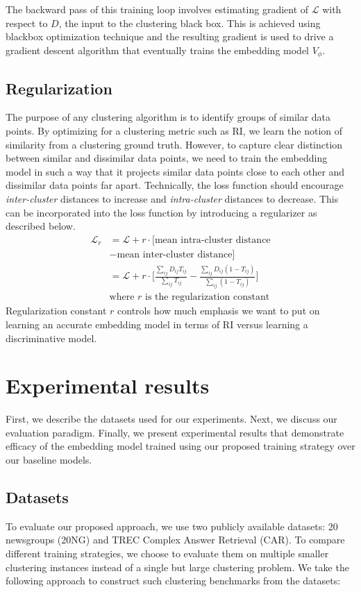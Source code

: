 \documentclass[11pt,a4paper]{article}
\begin{document}
The backward pass of this training loop involves estimating gradient of $\mathcal{L}$ with respect to $D$, the input to the clustering black box. This is achieved using blackbox optimization technique and the resulting gradient is used to drive a gradient descent algorithm that eventually trains the embedding model $V_\phi$. 

\subsection{Regularization}\label{sec:reg} The purpose of any clustering algorithm is to identify groups of similar data points. By optimizing for a clustering metric such as RI, we learn the notion of similarity from a clustering ground truth. However, to capture clear distinction between similar and dissimilar data points, we need to train the embedding model in such a way that it projects similar data points close to each other and dissimilar data points far apart. Technically, the loss function should encourage \textit{inter-cluster} distances to increase and \textit{intra-cluster} distances to decrease. This can be incorporated into the loss function by introducing a regularizer as described below.
\begin{align*}
    \mathcal{L}_{r} &= \mathcal{L} + r \cdot [\textrm{mean intra-cluster distance}\\ &- \textrm{mean inter-cluster distance}] \\
    &= \mathcal{L} + r \cdot \Bigg[\frac{\sum_{ij} D_{ij}T_{ij}}{\sum_{ij} T_{ij}} - \frac{\sum_{ij} D_{ij}(1-T_{ij})}{\sum_{ij}(1-T_{ij})}\Bigg] \\
    &\textrm{where $r$ is the regularization constant}
\end{align*}
Regularization constant $r$ controls how much emphasis we want to put on learning an accurate embedding model in terms of RI versus learning a discriminative model.

\section{Experimental results}
First, we describe the datasets used for our experiments. Next, we discuss our evaluation paradigm. Finally, we present experimental results that demonstrate efficacy of the embedding model trained using our proposed training strategy over our baseline models.

\subsection{Datasets} To evaluate our proposed approach, we use two publicly available datasets: 20 newsgroups (20NG) and TREC Complex Answer Retrieval (CAR). To compare different training strategies, we choose to evaluate them on multiple smaller clustering instances instead of a single but large clustering problem. We take the following approach to construct such clustering benchmarks from the datasets:
\end{document}
